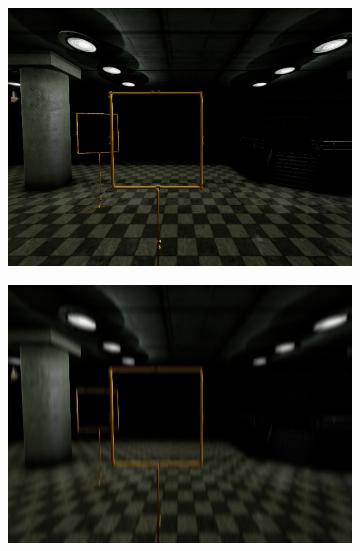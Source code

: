 \begin{figure}[bhtp]
	\centering
	\begin{subfigure}{0.33\textwidth}

		\includegraphics[width=\textwidth]{fig/gate_example}
		\label{fig:orig}
	\end{subfigure}
	\begin{subfigure}{0.33\textwidth}
		\includegraphics[width=\textwidth]{fig/gate_example_motionblur_v}
		\label{fig:motionblur}
	\end{subfigure}


\end{figure}

